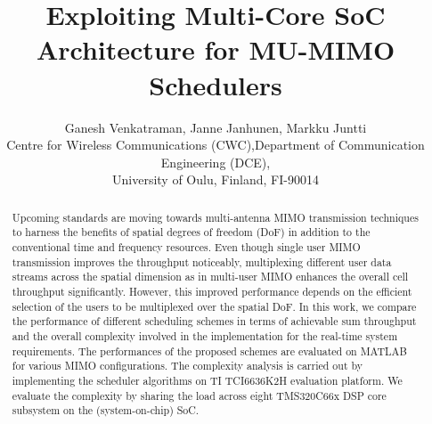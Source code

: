 \documentclass[conference,letterpaper,9pt]{./../IEEEtran}
\begin{document}
\title{Exploiting Multi-Core SoC Architecture for \acs{MU-MIMO} Schedulers}

\author{\begin{tabular}{cc}
\multicolumn{2}{c}{Ganesh Venkatraman, Janne Janhunen, Markku Juntti}\\
Centre for Wireless Communications (CWC), & Department of Communication Engineering (DCE), \\
\multicolumn{2}{c}{University of Oulu, Finland, FI-90014}\\
\end{tabular}}

\maketitle

\begin{abstract}
Upcoming standards are moving towards multi-antenna \ac{MIMO} transmission techniques to harness the benefits of spatial degrees of freedom (DoF) in addition to the conventional time and frequency resources. Even though single user \ac{MIMO} transmission improves the throughput noticeably, multiplexing different user data streams across the spatial dimension as in multi-user \ac{MIMO} enhances the overall cell throughput significantly. However, this improved performance depends on the efficient selection of the users to be multiplexed over the spatial DoF. In this work, we compare the performance of different scheduling schemes in terms of achievable sum throughput and the overall complexity involved in the implementation for the real-time system requirements. The performances of the proposed schemes are evaluated on MATLAB for various \ac{MIMO} configurations. The complexity analysis is carried out by implementing the scheduler algorithms on TI TCI6636K2H evaluation platform. We evaluate the complexity by sharing the load across eight TMS320C66x DSP core subsystem on the (system-on-chip) SoC.
\end{abstract}

\acresetall {}
\end{document}
